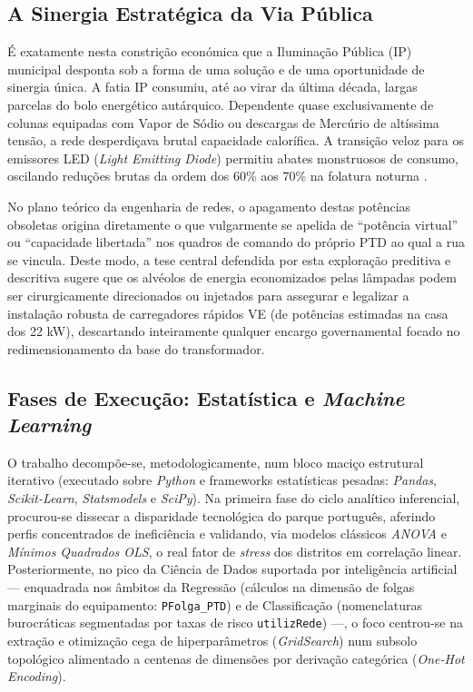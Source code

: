\documentclass[conference]{IEEEtran}
\begin{document}
\subsection{A Sinergia Estratégica da Via Pública}
É exatamente nesta constrição económica que a Iluminação Pública (IP) municipal desponta sob a forma de uma solução e de uma oportunidade de sinergia única. A fatia IP consumiu, até ao virar da última década, largas parcelas do bolo energético autárquico. Dependente quase exclusivamente de colunas equipadas com Vapor de Sódio ou descargas de Mercúrio de altíssima tensão, a rede desperdiçava brutal capacidade calorífica.
A transição veloz para os emissores LED (\textit{Light Emitting Diode}) permitiu abates monstruosos de consumo, oscilando reduções brutas da ordem dos 60\% aos 70\% na folatura noturna \cite{b5}. 

No plano teórico da engenharia de redes, o apagamento destas potências obsoletas origina diretamente o que vulgarmente se apelida de ``potência virtual'' ou ``capacidade libertada'' nos quadros de comando do próprio PTD ao qual a rua se vincula. Deste modo, a tese central defendida por esta exploração preditiva e descritiva sugere que os alvéolos de energia economizados pelas lâmpadas podem ser cirurgicamente direcionados ou injetados para assegurar e legalizar a instalação robusta de carregadores rápidos VE (de potências estimadas na casa dos 22 kW), descartando inteiramente qualquer encargo governamental focado no redimensionamento da base do transformador.

\subsection{Fases de Execução: Estatística e \textit{Machine Learning}}
O trabalho decompõe-se, metodologicamente, num bloco maciço estrutural iterativo (executado sobre \textit{Python} e frameworks estatísticas pesadas: \textit{Pandas}, \textit{Scikit-Learn}, \textit{Statsmodels} e \textit{SciPy}).
Na primeira fase do ciclo analítico inferencial, procurou-se dissecar a disparidade tecnológica do parque português, aferindo perfis concentrados de ineficiência e validando, via modelos clássicos \textit{ANOVA} e \textit{Mínimos Quadrados OLS}, o real fator de \textit{stress} dos distritos em correlação linear.
Posteriormente, no pico da Ciência de Dados suportada por inteligência artificial — enquadrada nos âmbitos da Regressão (cálculos na dimensão de folgas marginais do equipamento: \texttt{PFolga\_PTD}) e de Classificação (nomenclaturas burocráticas segmentadas por taxas de risco \texttt{utilizRede}) —, o foco centrou-se na extração e otimização cega de hiperparâmetros (\textit{GridSearch}) num subsolo topológico alimentado a centenas de dimensões por derivação categórica (\textit{One-Hot Encoding}).
\end{document}
